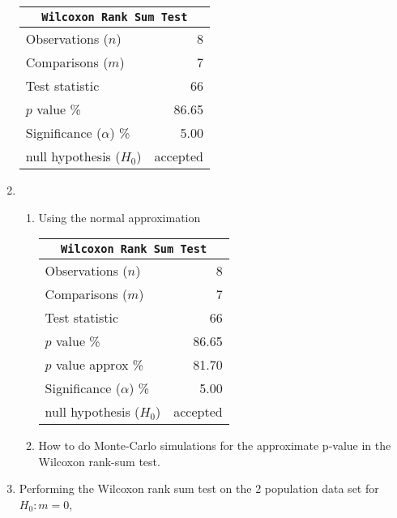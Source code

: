 \begin{enumerate}
	\begin{table}[H]
		\centering
		\begin{tabular}{@{}lr@{}}
			\toprule
			\multicolumn{2}{c}{\texttt{Wilcoxon Rank Sum Test}} \\
			\midrule
			Observations ($n$)         &         8 \\
			Comparisons ($m$)          &         7 \\
			Test statistic             &        66 \\
			$p$ value \%               &     86.65 \\
			Significance ($\alpha$) \% &      5.00 \\
			null hypothesis ($H_0$)    &  accepted \\
			\bottomrule
		\end{tabular}
		
	\end{table}
	\bigskip
	
	\item 
	\begin{enumerate}
		\item  Using the normal approximation\\
		\begin{table}[H]
			\centering
			\begin{tabular}{@{}lr@{}}
				\toprule
				\multicolumn{2}{c}{\texttt{Wilcoxon Rank Sum Test}} \\
				\midrule
				Observations ($n$)         &         8 \\
				Comparisons ($m$)          &         7 \\
				Test statistic             &        66 \\
				$p$ value \%               &     86.65 \\
				$p$ value approx \%        &     81.70 \\
				Significance ($\alpha$) \% &      5.00 \\
				null hypothesis ($H_0$)    &  accepted \\
				\bottomrule
			\end{tabular}
			
		\end{table}
		\bigskip
		
		\item How to do Monte-Carlo simulations for the approximate p-value in the Wilcoxon rank-sum test.
	\end{enumerate}

	\item Performing the Wilcoxon rank sum test on the 2 population data set for $ H_0 : m = 0 $,
	

\end{enumerate}
